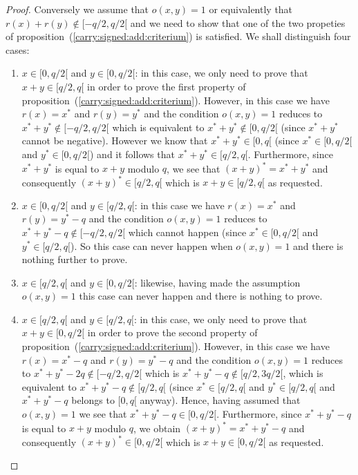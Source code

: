 \documentclass{article}
\begin{document}
\begin{proof}
  Conversely we assume that $o(x,y)=1$ or equivalently that 
  $r(x)+r(y)\not\in[-q/2,q/2[$ and we need to show that one of
  the two propeties of proposition~(\ref{carry:signed:add:criterium})
  is satisfied. We shall distinguish four cases:
  \begin{enumerate}
    \item $x\in[0,q/2[$ and $y\in[0,q/2[$: in this case, we only
      need to prove that $x+y\in[q/2,q[$ in order to prove the first 
      property of proposition~(\ref{carry:signed:add:criterium}).
      However, in this case we have $r(x)=x^{*}$ and $r(y)=y^{*}$
      and the condition $o(x,y)=1$ reduces to $x^{*}+y^{*}\not\in[-q/2,q/2[$
      which is equivalent to $x^{*}+y^{*}\not\in[0,q/2[$ (since $x^{*}+y^{*}$ 
      cannot be negative). However we know that $x^{*}+y^{*}\in[0,q[$ 
      (since $x^{*}\in[0,q/2[$ and $y^{*}\in[0,q/2[$) and it follows
      that $x^{*}+y^{*}\in[q/2,q[$. Furthermore, since $x^{*}+y^{*}$ is
      equal to $x+y$ modulo $q$, we see that $(x+y)^{*}=x^{*}+y^{*}$
      and consequently $(x+y)^{*}\in[q/2,q[$ which is $x+y\in[q/2,q[$
      as requested.
    \item $x\in[0,q/2[$ and $y\in[q/2,q[$: in this case we have $r(x)=x^{*}$
      and $r(y)=y^{*}-q$ and the condition $o(x,y)=1$ reduces to
      $x^{*}+y^{*}-q\not\in[-q/2,q/2[$ which cannot happen (since
      $x^{*}\in[0,q/2[$ and $y^{*}\in[q/2,q[$). So this case can 
      never happen when $o(x,y)=1$ and there is nothing further to 
      prove.
    \item $x\in[q/2,q[$ and $y\in[0,q/2[$: likewise, having made the
      assumption $o(x,y)=1$ this case can never happen and there is 
      nothing to prove.
    \item $x\in[q/2,q[$ and $y\in[q/2,q[$: in this case, we only 
      need to prove that $x+y\in[0,q/2[$ in order to prove the 
      second property of proposition~(\ref{carry:signed:add:criterium}). 
      However, in this case we have $r(x)=x^{*}-q$ and $r(y)=y^{*}-q$
      and the condition $o(x,y)=1$ reduces to 
      $x^{*}+y^{*}-2q\not\in[-q/2,q/2[$ which is $x^{*}+y^{*}-q\not\in
      [q/2,3q/2[$, which is equivalent to $x^{*}+y^{*}-q\not\in[q/2,q[$
      (since $x^{*}\in[q/2,q[$ and $y^{*}\in[q/2,q[$ and $x^{*}+y^{*}-q$
      belongs to $[0,q[$ anyway). Hence, having assumed that $o(x,y)=1$
      we see that $x^{*}+y^{*}-q\in[0,q/2[$. Furthermore, since
      $x^{*}+y^{*}-q$ is equal to $x+y$ modulo $q$, we obtain
      $(x+y)^{*}=x^{*}+y^{*}-q$ and consequently $(x+y)^{*}\in[0,q/2[$
      which is $x+y\in[0,q/2[$ as requested.
  \end{enumerate}
\end{proof}
\end{document}
